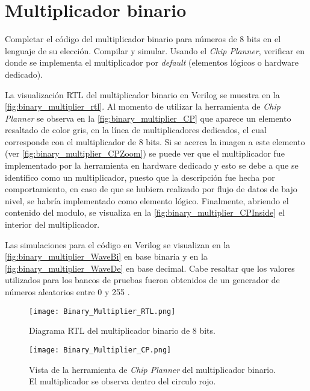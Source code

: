 \section{Multiplicador binario \label{sec:s1}}

\begin{center}
	\begin{minipage}{12cm}
		\begin{tcolorbox}[title=Actividad 1]
			Completar el código del multiplicador binario para números de 8 bits en el lenguaje de su elección. Compilar y simular. Usando el \textit{Chip Planner}, verificar en donde se implementa el multiplicador por \textit{default} (elementos lógicos o hardware dedicado).
		\end{tcolorbox}	
	\end{minipage}
\end{center}

La visualización RTL del multiplicador binario en Verilog se muestra en la \autoref{fig:binary_multiplier_rtl}. Al momento de utilizar la herramienta de \textit{Chip Planner} se observa en la \autoref{fig:binary_multiplier_CP} que aparece un elemento resaltado de color gris, en la línea de multiplicadores dedicados, el cual corresponde con el multiplicador de 8 bits. Si se acerca la imagen a este elemento (ver \autoref{fig:binary_multiplier_CPZoom}) se puede ver que el multiplicador fue implementado por la herramienta en hardware dedicado y esto se debe a que se identifico como un multiplicador, puesto que la descripción fue hecha por comportamiento, en caso de que se hubiera realizado por flujo de datos de bajo nivel, se habría implementado como elemento lógico. Finalmente, abriendo el contenido del modulo, se visualiza en la \autoref{fig:binary_multiplier_CPInside} el interior del multiplicador. 

Las simulaciones para el código en Verilog se visualizan en la \autoref{fig:binary_multiplier_WaveBi} en base binaria y en la \autoref{fig:binary_multiplier_WaveDe} en base decimal. Cabe resaltar que los valores utilizados para los bancos de pruebas fueron obtenidos de un generador de números aleatorios entre 0 y 255 \cite{numeros_2024}.

\begin{figure}[ht]
	\centering
	\texttt{[image: Binary\_Multiplier\_RTL.png]}
	\caption{Diagrama RTL del multiplicador binario de 8 bits. \label{fig:binary_multiplier_rtl}}
\end{figure}

\begin{figure}[ht]
	\centering
	\texttt{[image: Binary\_Multiplier\_CP.png]}
	\caption{Vista de la herramienta de \textit{Chip Planner} del multiplicador binario. El multiplicador se observa dentro del circulo rojo. \label{fig:binary_multiplier_CP}}
\end{figure}

